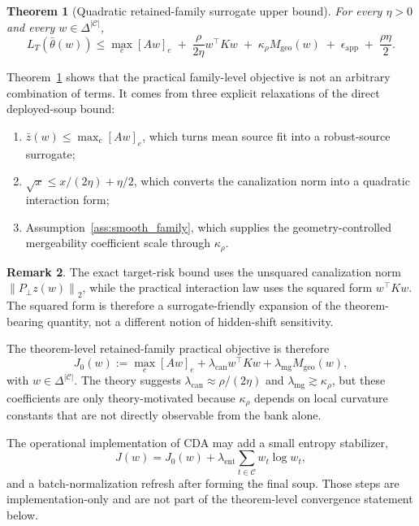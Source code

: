 \documentclass{article}
\newtheorem{theorem}{Theorem}[section]
\theoremstyle{definition}
\newtheorem{remark}[theorem]{Remark}
\newcommand{\cC}{\mathcal{C}}
\newcommand{\cda}{\textup{\textsc{CDA}}}
\newcommand{\simplex}{\Delta}
\newcommand{\norm}[1]{\left\lVert #1 \right\rVert}
\newcommand{\thetaw}{\bar{\theta}(w)}
\begin{document}
\begin{theorem}[Quadratic retained-family surrogate upper bound]
\label{thm:surrogate_upper}
For every \(\eta>0\) and every \(w\in\simplex^{|\cC|}\),
\begin{equation}
L_T(\thetaw)
\le
\max_e [Aw]_e
\;+\;
\frac{\rho}{2\eta}w^\top K w
\;+\;
\kappa_\rho M_{\mathrm{geo}}(w)
\;+\;
\epsilon_{\mathrm{app}}
\;+\;
\frac{\rho\eta}{2}.
\label{eq:surrogate_upper}
\end{equation}
\end{theorem}

Theorem~\ref{thm:surrogate_upper} shows that the practical family-level objective is not an arbitrary combination of terms. It comes from three explicit relaxations of the direct deployed-soup bound:
\begin{enumerate}[leftmargin=1.3em]
    \item \(\bar z(w)\le \max_e [Aw]_e\), which turns mean source fit into a robust-source surrogate;
    \item \(\sqrt{x}\le x/(2\eta)+\eta/2\), which converts the canalization norm into a quadratic interaction form;
    \item Assumption~\ref{ass:smooth_family}, which supplies the geometry-controlled mergeability coefficient scale through \(\kappa_\rho\).
\end{enumerate}

\begin{remark}
The exact target-risk bound uses the unsquared canalization norm \(\norm{P_\perp z(w)}_2\), while the practical interaction law uses the squared form \(w^\top K w\). The squared form is therefore a surrogate-friendly expansion of the theorem-bearing quantity, not a different notion of hidden-shift sensitivity.
\end{remark}

The theorem-level retained-family practical objective is therefore
\begin{equation}
J_0(w)
:=
\max_e [Aw]_e
+ \lambda_{\mathrm{can}} w^\top K w
+ \lambda_{\mathrm{mg}} M_{\mathrm{geo}}(w),
\label{eq:practical_objective}
\end{equation}
with \(w\in\simplex^{|\cC|}\). The theory suggests \(\lambda_{\mathrm{can}}\approx \rho/(2\eta)\) and \(\lambda_{\mathrm{mg}}\gtrsim \kappa_\rho\), but these coefficients are only theory-motivated because \(\kappa_\rho\) depends on local curvature constants that are not directly observable from the bank alone.

The operational implementation of \cda{} may add a small entropy stabilizer,
\[
J(w)=J_0(w)+\lambda_{\mathrm{ent}}\sum_{t\in\cC} w_t\log w_t,
\]
and a batch-normalization refresh after forming the final soup. Those steps are implementation-only and are not part of the theorem-level convergence statement below.
\end{document}
